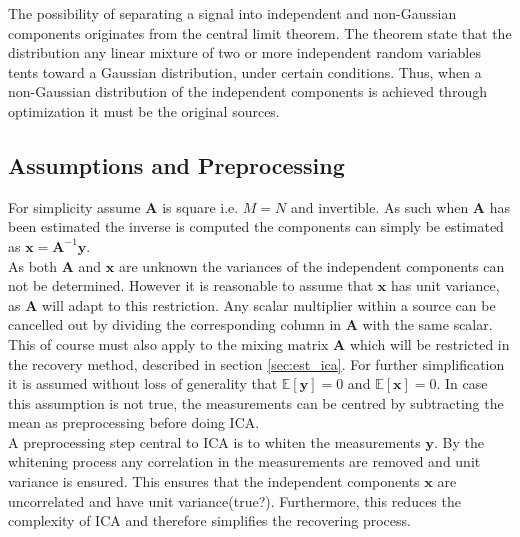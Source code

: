 The possibility of separating a signal into independent and non-Gaussian components originates from the central limit theorem\cite[p. 34]{ICA}. The theorem state that the distribution any linear mixture of two or more independent random variables tents toward a Gaussian distribution, under certain conditions. Thus, when a non-Gaussian distribution of the independent components is achieved through optimization it must be the original sources.

\subsection{Assumptions and Preprocessing}
For simplicity assume $\textbf{A}$ is square i.e. $M=N$ and invertible. As such when $\textbf{A}$ has been estimated the inverse is computed the components can simply be estimated as $\textbf{x}=\textbf{A}^{-1}\textbf{y}$\cite[p. 152-153]{ICA}.
\\ 
As both $\textbf{A}$ and $\textbf{x}$ are unknown the variances of the independent components can not be determined. However it is reasonable to assume that $\mathbf{x}$ has unit variance, as $\textbf{A}$ will adapt to this restriction. Any scalar multiplier within a source can be cancelled out by dividing the corresponding column in $\textbf{A}$ with the same scalar.\\  
This of course must also apply to the mixing matrix $\mathbf{A}$ which will be restricted in the recovery method, described in section \ref{sec:est_ica}.
For further simplification it is assumed without loss of generality that $\mathbb{E}[\mathbf{y}] = 0$ and $\mathbb{E}[\mathbf{x}] = 0$\cite[p. 154]{ICA}. In case this assumption is not true, the measurements can be centred by subtracting the mean as preprocessing before doing ICA.\\
A preprocessing step central to ICA is to whiten the measurements $\mathbf{y}$. By the whitening process any correlation in the measurements are removed and unit variance is ensured. This ensures that the independent components $\mathbf{x}$ are uncorrelated and have unit variance(true?). Furthermore, this reduces the complexity of ICA and therefore simplifies the recovering process.

